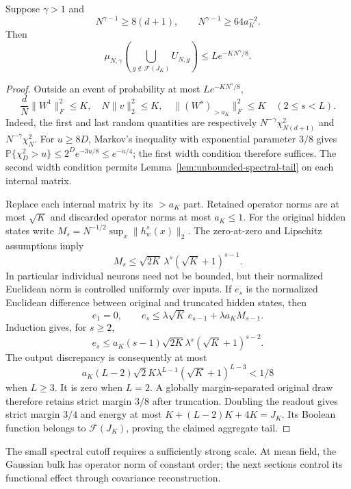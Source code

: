 \begin{proposition}
\label{prop:unbounded-aggregate}
Suppose $\gamma>1$ and
\[
 N^{\gamma-1}\ge8(d+1),\qquad
 N^{\gamma-1}\ge64a_K^{-2}.
\]
Then
\[
 \mu_{N,\gamma}\!\left(\bigcup_{g\notin\mathcal F(J_K)}U_{N,g}\right)
 \le L e^{-KN^\gamma/8}.
\]
\end{proposition}
\begin{proof}
Outside an event of probability at most $Le^{-KN^\gamma/8}$,
\[
 \frac dN\|W^1\|_F^2\le K,\quad N\|v\|_2^2\le K,
 \quad\|(W^s)_{>a_K}\|_F^2\le K\quad(2\le s<L).
\]
Indeed, the first and last random quantities are respectively
$N^{-\gamma}\chi^2_{N(d+1)}$ and $N^{-\gamma}\chi^2_N$.
For $u\ge8D$, Markov's inequality with exponential parameter $3/8$ gives
$\mathbb P\{\chi_D^2>u\}\le 2^D e^{-3u/8}\le e^{-u/4}$; the first width condition
therefore suffices. The second width condition permits
Lemma~\ref{lem:unbounded-spectral-tail} on each internal matrix.

Replace each internal matrix by its $>a_K$ part. Retained operator norms
are at most $\sqrt K$ and discarded operator norms at most $a_K\le1$.
For the original hidden states write
$M_s=N^{-1/2}\sup_x\|h_w^s(x)\|_2$. The zero-at-zero and Lipschitz
assumptions imply
\[
 M_s\le\sqrt{2K}\,\lambda^s(\sqrt K+1)^{s-1}.
\]
In particular individual neurons need not be bounded, but their normalized
Euclidean norm is controlled uniformly over inputs. If $e_s$ is the
normalized Euclidean difference between original and truncated hidden
states, then
\[
 e_1=0,\qquad e_s\le\lambda\sqrt K\,e_{s-1}+\lambda a_K M_{s-1}.
\]
Induction gives, for $s\ge2$,
\[
 e_s\le a_K(s-1)\sqrt{2K}\lambda^s(\sqrt K+1)^{s-2}.
\]
The output discrepancy is consequently at most
\[
 a_K(L-2)\sqrt2K\lambda^{L-1}(\sqrt K+1)^{L-3}<1/8
\]
when $L\ge3$. It is zero when $L=2$.
A globally margin-separated original draw therefore retains strict margin
$3/8$ after truncation. Doubling the readout gives strict margin $3/4$
and energy at most $K+(L-2)K+4K=J_K$. Its Boolean function belongs
to $\mathcal F(J_K)$, proving the claimed aggregate tail.
\end{proof}

The small spectral cutoff requires a sufficiently strong scale. At mean
field, the Gaussian bulk has operator norm of constant order; the next
sections control its functional effect through covariance reconstruction.
